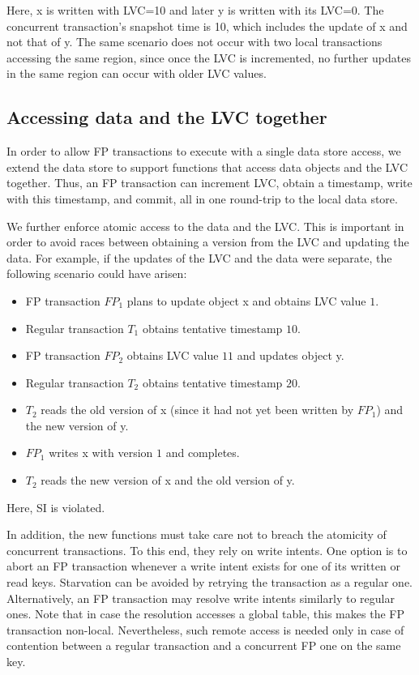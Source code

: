 Here, x is written with LVC=10 and later y is written with its LVC=0. The
concurrent transaction's snapshot time is 10, which includes the update of x and
not that of y. The same scenario does not occur with two local transactions
accessing the same region, since once the LVC is incremented, no further
updates in the same region can occur with older LVC values.



\subsection{Accessing data and the LVC together} \label{ssec:lvc-access}

In order to allow FP transactions to execute with a single data store access,
we extend the data store to support functions that access data objects and the
LVC together. Thus, an FP transaction can increment LVC, obtain a timestamp, 
write with this timestamp, and commit, all in one round-trip to the local data store.

We further enforce atomic access to the data and the LVC. This is important in
order to avoid races between obtaining a version from the LVC and updating the
data. For example, if the updates of the LVC and the data were separate, the
following scenario could have arisen:
\begin{itemize}
  \item FP transaction $FP_1$ plans to update object x and obtains LVC value $1$.
  \item Regular transaction $T_1$ obtains tentative timestamp $10$.
  \item FP transaction $FP_2$ obtains LVC value $11$ and updates object y.
  \item Regular transaction $T_2$ obtains tentative timestamp $20$.
  \item $T_2$ reads the old version of x  (since it had not yet been written by $FP_1$)
  and the new version of  y.
  \item $FP_1$ writes x with version $1$ and completes.
  \item $T_2$ reads the new version of x and the old version of  y.
\end{itemize}
Here, SI is violated.

In addition, the new functions must take care not to breach the  atomicity of concurrent transactions. 
To this end, they rely on  write intents. 
One option is to abort an FP transaction whenever a write intent exists for one of its written or read keys. 
Starvation can be avoided by retrying the transaction as a regular one.
Alternatively, an FP transaction may resolve write intents similarly to regular ones.
Note that in case the resolution accesses a global table, this makes the FP transaction non-local.
Nevertheless, such remote access is needed only in case of contention between a regular transaction 
and a concurrent FP one on the same key.


